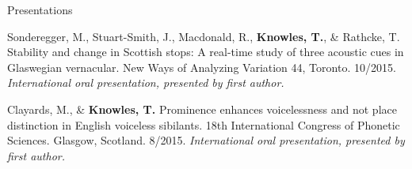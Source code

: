 \documentclass{resume} %
\begin{document}
\begin{rSection}{Presentations}
%	
%	
%	
	
	Sonderegger, M., Stuart-Smith, J., Macdonald, R., {\bf Knowles, T.}, \& Rathcke, T. Stability and change in Scottish stops: A real-time study of three acoustic cues in Glaswegian vernacular. New Ways of Analyzing Variation 44, Toronto. 10/2015. \emph{International oral presentation, presented by first author.}
	
	Clayards, M., \& {\bf Knowles, T.} Prominence enhances voicelessness and not place distinction in English voiceless sibilants. 18th International Congress of Phonetic Sciences. Glasgow, Scotland. 8/2015. \emph{International oral presentation, presented by first author.}
	

\end{rSection}
\end{document}
